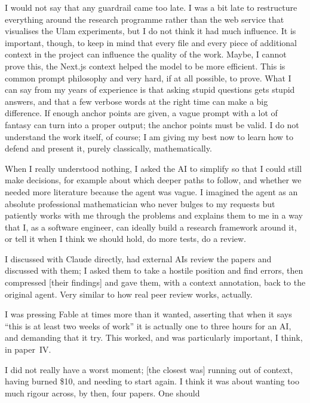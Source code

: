 \documentclass[11pt,a4paper]{article}
\begin{document}
\begin{description}[leftmargin=1.2em,itemsep=4pt,font=\normalfont\itshape]
I would not say that any guardrail came too late. I was a bit late to restructure everything around the research
programme rather than the web service that visualises the Ulam experiments, but I do not think it had much influence.
It is important, though, to keep in mind that every file and every piece of additional context in the project can
influence the quality of the work. Maybe, I cannot prove this, the Next.js context helped the model to be more
efficient. This is common prompt philosophy and very hard, if at all possible, to prove. What I can say from my
years of experience is that asking stupid questions gets stupid answers, and that a few verbose words at the right
time can make a big difference. If enough anchor points are given, a vague prompt with a lot of fantasy can turn into
a proper output; the anchor points must be valid. I do not understand the work itself, of course; I am giving my best
now to learn how to defend and present it, purely classically, mathematically.
\item[Q6, the research register.] When I really understood nothing, I asked the AI to simplify so that I could still
make decisions, for example about which deeper paths to follow, and whether we needed more literature because the
agent was vague. I imagined the agent as an absolute professional mathematician who never bulges to my requests but
patiently works with me through the problems and explains them to me in a way that I, as a software engineer, can
ideally build a research framework around it, or tell it when I think we should hold, do more tests, do a review.
\item[Q7, deciding without checking the mathematics.] I discussed with Claude directly, had external AIs review the
papers and discussed with them; I asked them to take a hostile position and find errors, then compressed [their
findings] and gave them, with a context annotation, back to the original agent. Very similar to how real peer review
works, actually.
\item[Q8, effort and stopping.] I was pressing Fable at times more than it wanted, asserting that when it says ``this
is at least two weeks of work'' it is actually one to three hours for an AI, and demanding that it try. This worked,
and was particularly important, I think, in paper~IV.
\item[Q9, worst moment.] I did not really have a worst moment; [the closest was] running out of context, having burned
\$10, and needing to start again. I think it was about wanting too much rigour across, by then, four papers. One should

\end{description}
\end{document}
